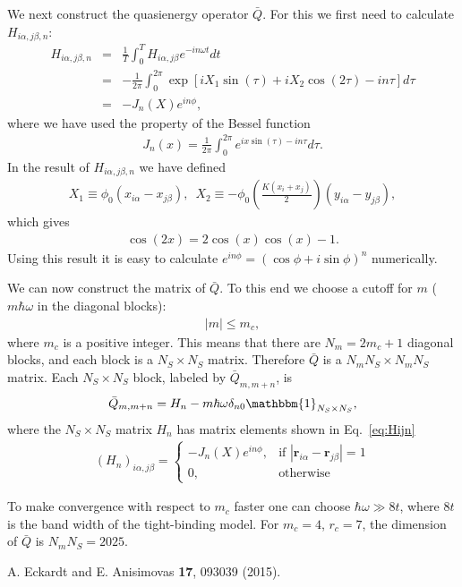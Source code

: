 \documentclass[11pt,letterpaper]{article}
\begin{document}
We next construct the quasienergy operator $\bar{Q}$. For this we first need to calculate $H_{i\alpha,j\beta,n}$:
\begin{eqnarray}\label{eq:HijDn}
	H_{i\alpha,j\beta,n} &=& \frac{1}{T} \int_0^T H_{i\alpha,j\beta} e^{-in\omega t} dt \\\nonumber
	&=& -\frac{1}{2\pi} \int_0^{2\pi} \exp\left[ iX_1\sin(\tau) +iX_2\cos(2\tau) - i n\tau \right] d\tau \\\nonumber
	&=& -J_n(X)e^{in \phi},
\end{eqnarray}
where we have used the property of the Bessel function
\begin{eqnarray}
	J_n(x) = \frac{1}{2\pi} \int_0^{2\pi} e^{ix\sin(\tau)-in\tau} d\tau.
\end{eqnarray}
In the result of $H_{i\alpha,j\beta,n}$ we have defined
\begin{eqnarray}
	X_1\equiv \phi_0(x_{i\alpha}-x_{j\beta}),\,\,\, X_2\equiv -\phi_0\left(\frac{K(x_i+x_j)}{2}\right ) (y_{i\alpha} - y_{j\beta}),
\end{eqnarray}
which gives
\begin{eqnarray}
	\cos(2x) = 2\cos(x)\cos(x) -1.
\end{eqnarray}
Using this result it is easy to calculate $e^{in\phi} = (\cos \phi + i \sin \phi)^n$ numerically.

We can now construct the matrix of $\bar{Q}$. To this end we choose a cutoff for $m$ ($m\hbar \omega$ in the diagonal blocks):
\begin{eqnarray}
	|m|\le m_c,
\end{eqnarray}
where $m_c$ is a positive integer. This means that there are $N_m = 2 m_c + 1$ diagonal blocks, and each block is a $N_S\times N_S$ matrix. Therefore $\bar{Q}$ is a $N_m N_S \times N_m N_S$ matrix. Each $N_S \times N_S$ block, labeled by $\bar{Q}_{m,m+n}$, is
\begin{eqnarray}
	\bar{Q}_{m,m+n} = H_n - m\hbar \omega \delta_{n0} \mathbbm{1}_{N_S\times N_S},
\end{eqnarray} 
where the $N_S \times N_S$ matrix $H_n$ has matrix elements shown in Eq.~\ref{eq:Hijn}
\begin{eqnarray}
	(H_n)_{i\alpha,j\beta} = \begin{cases}
		-J_n(X)e^{in \phi},& \text{if } |\bm r_{i\alpha} - \bm r_{j\beta}| = 1\\
		0, & \text{otherwise} 
	\end{cases}
\end{eqnarray}

To make convergence with respect to $m_c$ faster one can choose $\hbar \omega \gg 8t$, where $8t$ is the band width of the tight-binding model. For $m_c = 4$, $r_c = 7$, the dimension of $\bar{Q}$ is $N_m N_S = 2025$.

\begin{thebibliography}{99}

 A. Eckardt and E. Anisimovas \textbf{17}, 093039 (2015).
\end{thebibliography}
\end{document}
